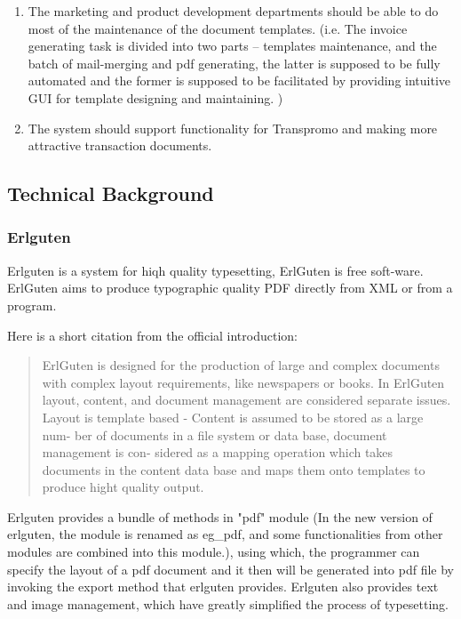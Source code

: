 \documentclass{report}
\begin{document}
\begin{enumerate}
\item The marketing and product development departments should be able to do most of the maintenance of the document templates. (i.e. The invoice generating task is divided into two parts -- templates maintenance, and the batch of mail-merging and pdf generating, the latter is supposed to be fully automated and the former is supposed to be facilitated by providing intuitive GUI for template designing and maintaining. )
\item The system should support functionality for Transpromo and making more attractive transaction documents.
\end{enumerate}

\subsection{Technical Background}
\subsubsection{Erlguten}
  Erlguten is a system for hiqh quality typesetting, ErlGuten is free soft-ware. ErlGuten aims to produce typographic quality PDF directly from XML or from a program.\cite{erlguten03}
 
  Here is a short citation from the official introduction:

\begin{quote}
  ErlGuten is designed for the production of large and complex documents
with complex layout requirements, like newspapers or books. In ErlGuten
layout, content, and document management are considered separate issues.
Layout is template based - Content is assumed to be stored as a large num-
ber of documents in a file system or data base, document management is con-
sidered as a mapping operation which takes documents in the content data
base and maps them onto templates to produce hight quality output.\cite{erlguten03} 
\end{quote}

  Erlguten provides a bundle of methods in "pdf" module (In the new version of erlguten, the module is renamed as eg\_pdf, and some functionalities from other modules are combined into this module.), using which, the programmer can specify the layout of a pdf document and it then will be generated into pdf file by invoking the export method that erlguten provides. Erlguten also provides text and image management, which have greatly simplified the process of typesetting. 
\end{document}
